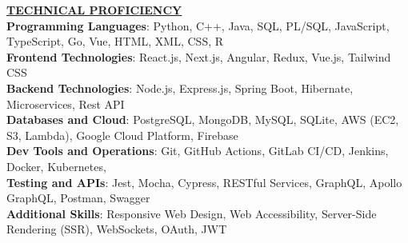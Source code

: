 \documentclass{article}
\begin{document}
\noindent \textbf{\underline{TECHNICAL PROFICIENCY}} \\
\textbf{Programming Languages}{: \small Python, C++, Java, SQL, PL/SQL, JavaScript, TypeScript, Go, Vue, HTML, XML, CSS, R} \\
\textbf{Frontend Technologies}{: \small React.js, Next.js, Angular, Redux, Vue.js, Tailwind CSS} \\
\textbf{Backend Technologies}{: \small Node.js, Express.js, Spring Boot, Hibernate, Microservices, Rest API} \\
\textbf{Databases and Cloud}{: \small PostgreSQL, MongoDB, MySQL, SQLite, AWS (EC2, S3, Lambda), Google Cloud Platform, Firebase} \\
\textbf{Dev Tools and Operations}{: \small Git, GitHub Actions, GitLab CI/CD, Jenkins, Docker, Kubernetes,} \\
\textbf{Testing and APIs}{: \small Jest, Mocha, Cypress, RESTful Services, GraphQL, Apollo GraphQL, Postman, Swagger} \\
\textbf{Additional Skills}{: \small Responsive Web Design, Web Accessibility, Server-Side Rendering (SSR), WebSockets, OAuth, JWT}

\vspace{2mm} 

\end{document}
